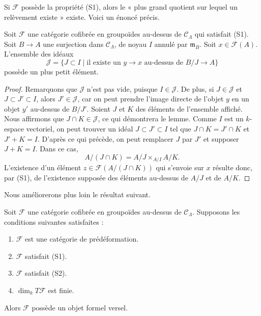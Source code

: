 \noindent
Si $\mathcal{F}$ possède la propriété (S1), alors le « plus grand quotient sur
lequel un relèvement existe » existe. Voici un énoncé précis.

\begin{lemma}
\label{lemma-largest-closed-where-lift}
Soit $\mathcal{F}$ une catégorie cofibrée en groupoïdes au-dessus de
$\mathcal{C}_\Lambda$ qui satisfait (S1). Soit $B \to A$ une surjection dans
$\mathcal{C}_\Lambda$, de noyau $I$ annulé par $\mathfrak m_B$. Soit
$x \in \mathcal{F}(A)$. L'ensemble des idéaux
$$
\mathcal{J} = \{ J \subset I \mid
\text{il existe un }y \to x\text{ au-dessus de }B/J \to A\}
$$
possède un plus petit élément.
\end{lemma}

\begin{proof}
Remarquons que $\mathcal{J}$ n'est pas vide, puisque
$I \in \mathcal{J}$. De plus, si $J \in \mathcal{J}$ et
$J \subset J' \subset I$, alors $J' \in \mathcal{J}$, car on peut prendre
l'image directe de l'objet $y$ en un objet $y'$ au-dessus de $B/J'$. Soient
$J$ et $K$ des éléments de l'ensemble affiché. Nous affirmons que
$J \cap K \in \mathcal{J}$, ce qui démontrera le lemme. Comme $I$ est un
$k$-espace vectoriel, on peut trouver un idéal $J \subset J' \subset I$ tel
que $J \cap K = J' \cap K$ et $J' + K = I$. D'après ce qui précède, on peut
remplacer $J$ par $J'$ et supposer $J + K = I$. Dans ce cas,
$$
A/(J \cap K) = A/J \times_{A/I} A/K.
$$
L'existence d'un élément $z \in \mathcal{F}(A/(J \cap K))$ qui s'envoie sur
$x$ résulte donc, par (S1), de l'existence supposée des éléments au-dessus de
$A/J$ et de $A/K$.
\end{proof}

\noindent
Nous améliorerons plus loin le résultat suivant.

\begin{lemma}
\label{lemma-versal-object-existence}
Soit $\mathcal{F}$ une catégorie cofibrée en groupoïdes au-dessus de
$\mathcal{C}_\Lambda$. Supposons les conditions suivantes satisfaites :
\begin{enumerate}
\item $\mathcal{F}$ est une catégorie de prédéformation.
\item $\mathcal{F}$ satisfait (S1).
\item $\mathcal{F}$ satisfait (S2).
\item $\dim_k T\mathcal{F}$ est finie.
\end{enumerate}
Alors $\mathcal{F}$ possède un objet formel versel.
\end{lemma}


